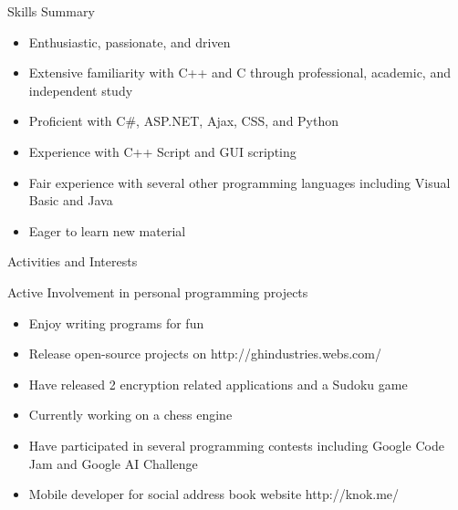 \documentclass[11pt]{article}
\begin{document}
	\begin{section}{Skills Summary}

		\begin{itemize}
			\item Enthusiastic, passionate, and driven
			\item Extensive familiarity with C++ and C through professional, academic, and independent study
			\item Proficient with C\#, ASP.NET, Ajax, CSS, and Python %
			\item Experience with C++ Script and GUI scripting
			\item Fair experience with several other programming languages including Visual Basic and Java %
			\item Eager to learn new material
		\end{itemize}

	\end{section}

	\begin{section}{Activities and Interests} \\ %

		\begin{bf}Active Involvement in personal programming projects\end{bf}

		\begin{itemize}
			\item Enjoy writing programs for fun
			\item Release open-source projects on http://ghindustries.webs.com/
			\item Have released 2 encryption related applications and a Sudoku game %
            \item Currently working on a chess engine
            \item Have participated in several programming contests including Google Code Jam and Google AI Challenge
            \item Mobile developer for social address book website http://knok.me/
		\end{itemize}

	\end{section}
\end{document}
